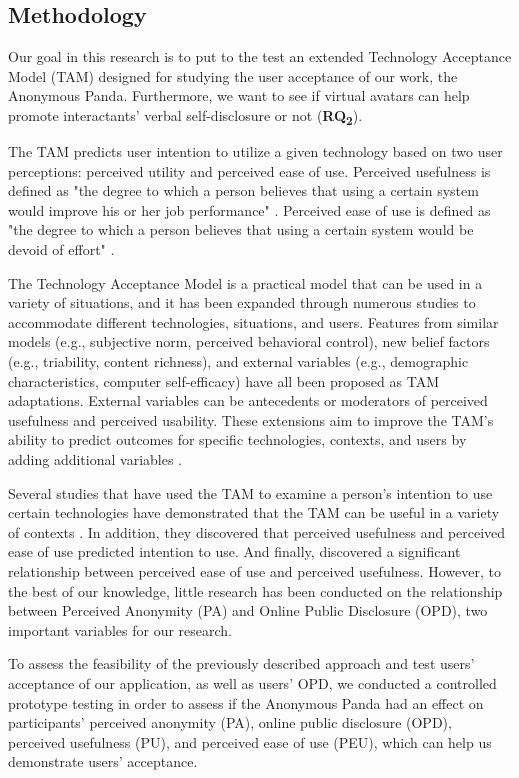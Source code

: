 \subsection{Methodology}
Our goal in this research is to put to the test an extended Technology Acceptance Model (TAM) designed for studying the user acceptance of our work, the Anonymous Panda. Furthermore, we want to see if virtual avatars can help promote interactants' verbal self-disclosure or not (\textbf{RQ\textsubscript{2}}).

The TAM predicts user intention to utilize a given technology based on two user perceptions: perceived utility and perceived ease of use. Perceived usefulness is defined as "the degree to which a person believes that using a certain system would improve his or her job performance" \cite{DAV89}. Perceived ease of use is defined as "the degree to which a person believes that using a certain system would be devoid of effort" \cite{DAV89}.

The Technology Acceptance Model is a practical model that can be used in a variety of situations, and it has been expanded through numerous studies to accommodate different technologies, situations, and users. Features from similar models (e.g., subjective norm, perceived behavioral control), new belief factors (e.g., triability, content richness), and external variables (e.g., demographic characteristics, computer self-efficacy) have all been proposed as TAM adaptations. External variables can be antecedents or moderators of perceived usefulness and perceived usability. These extensions aim to improve the TAM's ability to predict outcomes for specific technologies, contexts, and users by adding additional variables \cite{CAM20}.

Several studies that have used the TAM to examine a person's intention to use certain technologies have demonstrated that the TAM can be useful in a variety of contexts \cite{CAM20}. In addition, they discovered that perceived usefulness and perceived ease of use predicted intention to use. And finally, discovered a significant relationship between perceived ease of use and perceived usefulness. However, to the best of our knowledge, little research has been conducted on the relationship between Perceived Anonymity (PA) and Online Public Disclosure (OPD), two important variables for our research.

To assess the feasibility of the previously described approach and test users' acceptance of our application, as well as users' OPD, we conducted a controlled prototype testing in order to assess if the Anonymous Panda had an effect on participants' perceived anonymity (PA), online public disclosure (OPD), perceived usefulness (PU), and perceived ease of use (PEU), which can help us demonstrate users' acceptance.

